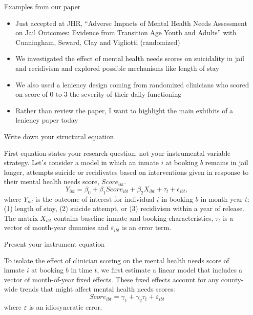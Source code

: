\documentclass{beamer}
\begin{document}
\begin{frame}{Examples from our paper}

\begin{itemize}
\item Just accepted at JHR, ``Adverse Impacts of Mental Health Needs Assessment on Jail Outcomes: Evidence from Transition Age Youth and Adults'' with Cunningham, Seward, Clay and Vigliotti (randomized)

\item We investigated the effect of mental health needs scores on suicidality in jail and recidivism and explored possible mechanisms like length of stay

\item We also used a leniency design coming from randomized clinicians who scored on score of 0 to 3 the severity of their daily functioning

\item Rather than review the paper, I want to highlight the main exhibits of a leniency paper today

\end{itemize}

\end{frame}

\begin{frame}{Write down your structural equation}

First equation states your research question, not your instrumental variable strategy.  Let's consider a model in which an inmate $i$ at booking $b$ remains in jail longer, attempts suicide or recidivates based on interventions given in response to their mental health needs score, $Score_{ibt}$. 
\begin{equation}
    Y_{ibt} = \beta_0 + \beta_1 Score_{ibt} + \beta_2 X_{ibt} + \tau_t + \epsilon_{ibt},
    \label{eq:ols}
\end{equation}where $Y_{ibt}$ is the outcome of interest for individual $i$ in booking $b$ in month-year $t$: (1) length of stay, (2) suicide attempt, or (3) recidivism within a year of release.  The matrix $X_{ibt}$ contains baseline inmate and booking characteristics, $\tau_t$ is a vector of month-year dummies and $\varepsilon_{ibt}$ is an error term.  

\end{frame}

\begin{frame}{Present your instrument equation}

To isolate the effect of clinician scoring on the mental health needs score of inmate $i$ at booking $b$ in time $t$, we first estimate a linear model that includes a vector of month-of-year fixed effects. These fixed effects account for any county-wide trends that might affect mental health needs scores:
\begin{equation}
    \label{eq:residual}
    Score_{ibt} = \gamma_1 + \gamma_2 \tau_t + \varepsilon_{ibt} 
\end{equation}where $\varepsilon$ is an idiosyncratic error.  
\end{frame}
\end{document}

